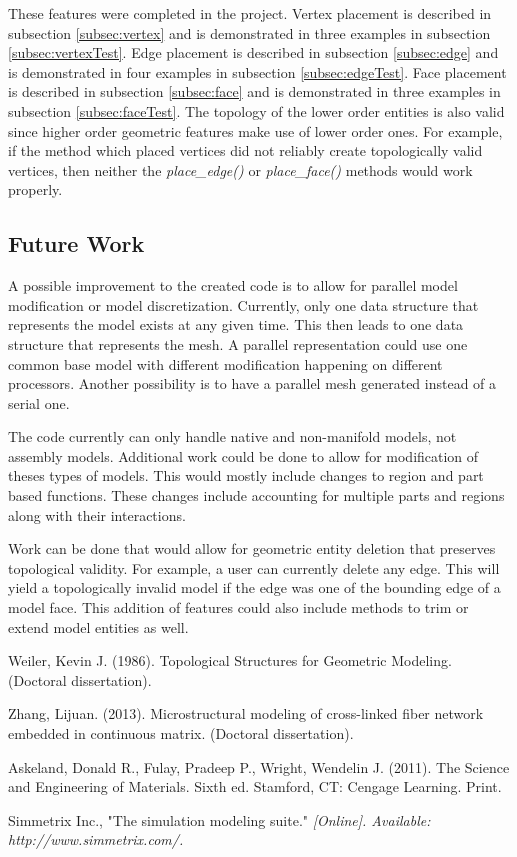\documentclass[a4paper, 12pt]{article}
\begin{document}
These features were completed in the project.
Vertex placement is described in subsection \ref{subsec:vertex}
and is demonstrated in three examples in subsection \ref{subsec:vertexTest}.
Edge placement is described in subsection \ref{subsec:edge}
and is demonstrated in four examples in subsection \ref{subsec:edgeTest}.
Face placement is described in subsection \ref{subsec:face}
and is demonstrated in three examples in subsection \ref{subsec:faceTest}.
The topology of the lower order entities is also valid since 
higher order geometric features make use of lower order ones.
For example, if the method which placed vertices did not reliably create
topologically valid vertices, then neither the \emph{place\_edge()} or 
\emph{place\_face()} methods would work properly. 

\subsection{Future Work} \label{subsec:future}
A possible improvement to the created code is to allow for parallel 
model modification or model discretization. Currently, only one
data structure that represents the model exists at any given time. 
This then leads to one data structure that represents the mesh. 
A parallel representation could use one common base model 
with different modification happening on different processors. 
Another possibility is to have a parallel mesh generated 
instead of a serial one.

The code currently can only handle native and non-manifold models, 
not assembly models. Additional work could be done to allow
for modification of theses types of models. This would mostly
include changes to region and part based functions. These changes 
include accounting for multiple parts and regions along with 
their interactions.

Work can be done that would allow for geometric entity deletion
that preserves topological validity. For example, a user can 
currently delete any edge. This will yield a topologically 
invalid model if the edge was one of the bounding edge of a 
model face. This addition of features could also
include methods to trim or extend model entities as well. 

\newpage
\begin{thebibliography}{99}

Weiler, Kevin J.
(1986).
Topological Structures for Geometric Modeling.
(Doctoral dissertation).

Zhang, Lijuan.
(2013).
Microstructural modeling of cross-linked 
fiber network embedded in continuous matrix.
(Doctoral dissertation).

Askeland, Donald R., Fulay, Pradeep P., Wright, Wendelin J.
(2011).
The Science and Engineering of Materials.
Sixth ed.
Stamford, CT: Cengage Learning.
Print.

Simmetrix Inc., 
"The simulation modeling suite."
\textit{[Online]. Available: http://www.simmetrix.com/.}

\end{thebibliography}
\end{document}
